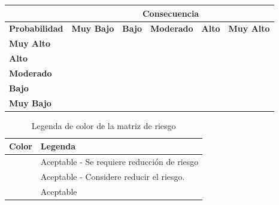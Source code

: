 \documentclass{article}
\begin{document}

\begin{table}[H]
\begin{tabular}{|l|l|l|l|l|l|}
\hline
                      & \multicolumn{5}{c|}{\textbf{Consecuencia}}                                                                                                                  \\ \hline
\textbf{Probabilidad} & \textbf{Muy Bajo}        & \textbf{Bajo}            & \textbf{Moderado}        & \textbf{Alto}            & \textbf{Muy Alto}                               \\ \hline
\textbf{Muy Alto}     & \cellcolor{yellow! 50}& \cellcolor{yellow! 50}& \cellcolor{yellow! 50}& \cellcolor{red! 50}  & \cellcolor{red! 50}  \\ \hline
\textbf{Alto}         & \cellcolor{yellow! 50}& \cellcolor{yellow! 50}& \cellcolor{yellow! 50}& \cellcolor{red! 50}  & \cellcolor{red! 50}  \\ \hline
\textbf{Moderado}     & \cellcolor{green! 50}  & \cellcolor{yellow! 50}& \cellcolor{yellow! 50}& \cellcolor{yellow! 50}& \cellcolor{red! 50}  \\ \hline
\textbf{Bajo}         & \cellcolor{green! 50}  & \cellcolor{green! 50}  & \cellcolor{yellow! 50}& \cellcolor{yellow! 50}& \cellcolor{red! 50}  \\ \hline
\textbf{Muy Bajo}     & \cellcolor{green! 50}  & \cellcolor{green! 50}  & \cellcolor{yellow! 50}& \cellcolor{yellow! 50}& \cellcolor{yellow! 50}\\ \hline
\end{tabular}
\end{table}



\begin{table}[H]
\centering
\caption{Legenda de color de la matriz de riesgo}
\begin{tabular}{|p{2cm}|p{10cm}|}
\hline \bf Color & \bf Legenda \\
\hline \cellcolor{red! 50} & Aceptable - Se requiere reducción de riesgo\\ [10pt]
\hline \cellcolor{yellow! 50} & Aceptable - Considere reducir el riesgo. \\[10pt]
\hline \cellcolor{green! 50} & Aceptable \\ [10pt]
\hline
\end{tabular}
\end{table}
\end{document}
